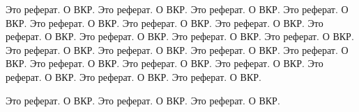 Это реферат. О ВКР.
Это реферат. О ВКР.
Это реферат. О ВКР.
Это реферат. О ВКР.
Это реферат. О ВКР.
Это реферат. О ВКР.
Это реферат. О ВКР.
Это реферат. О ВКР.
Это реферат. О ВКР.
Это реферат. О ВКР.
Это реферат. О ВКР.
Это реферат. О ВКР.
Это реферат. О ВКР.
Это реферат. О ВКР.
Это реферат. О ВКР.
Это реферат. О ВКР.
Это реферат. О ВКР.
Это реферат. О ВКР.
Это реферат. О ВКР.
Это реферат. О ВКР.
Это реферат. О ВКР.

Это реферат. О ВКР.
Это реферат. О ВКР.
Это реферат. О ВКР.
